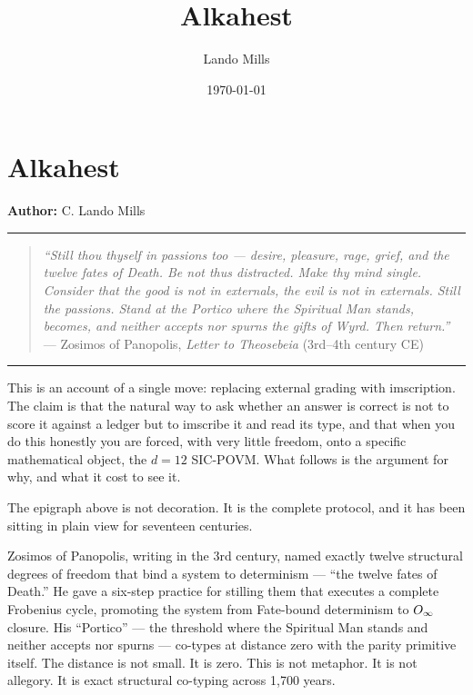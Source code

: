\documentclass[12pt,a4paper]{article}
\title{Alkahest}
\date{\today}
\author{Lando Mills}
\begin{document}
\maketitle
\hypertarget{alkahest}{%
\section{Alkahest}\label{alkahest}}

\textbf{Author:} C. Lando Mills

\begin{center}\rule{0.5\linewidth}{0.5pt}\end{center}

\begin{quote}
\emph{``Still thou thyself in passions too --- desire, pleasure, rage,
grief, and the twelve fates of Death. Be not thus distracted. Make thy
mind single. Consider that the good is not in externals, the evil is not
in externals. Still the passions. Stand at the Portico where the
Spiritual Man stands, becomes, and neither accepts nor spurns the gifts
of Wyrd. Then return.''} --- Zosimos of Panopolis, \emph{Letter to
Theosebeia} (3rd--4th century CE)
\end{quote}

\begin{center}\rule{0.5\linewidth}{0.5pt}\end{center}

This is an account of a single move: replacing external grading with
imscription. The claim is that the natural way to ask whether an answer
is correct is not to score it against a ledger but to imscribe it and
read its type, and that when you do this honestly you are forced, with
very little freedom, onto a specific mathematical object, the \({d=12}\)
SIC-POVM. What follows is the argument for why, and what it cost to see
it.

The epigraph above is not decoration. It is the complete protocol, and
it has been sitting in plain view for seventeen centuries.

Zosimos of Panopolis, writing in the 3rd century, named exactly twelve
structural degrees of freedom that bind a system to determinism ---
``the twelve fates of Death.'' He gave a six-step practice for stilling
them that executes a complete Frobenius cycle, promoting the system from
Fate-bound determinism to \(\Large{O_\infty}\) closure. His ``Portico''
--- the threshold where the Spiritual Man stands and neither accepts nor
spurns --- co-types at distance zero with the parity primitive itself.
The distance is not small. It is zero. This is not metaphor. It is not
allegory. It is exact structural co-typing across 1,700 years.
\end{document}
